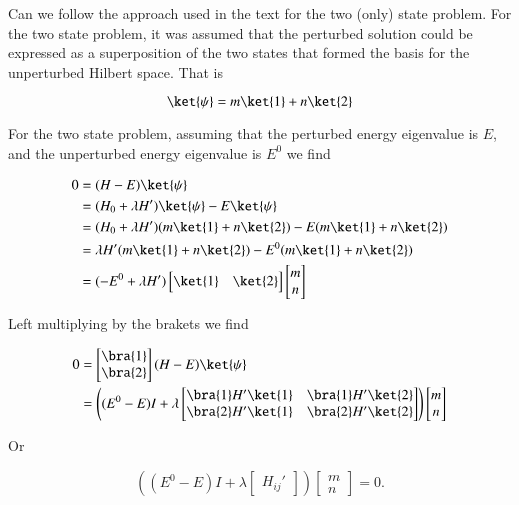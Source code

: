 Can we follow the approach used in the text for the two (only) state problem.  For the two state problem, it was assumed that the perturbed solution could be expressed as a superposition of the two states that formed the basis for the unperturbed Hilbert space.  That is

\begin{equation}\label{eqn:pertubationDegeneracy:30}
\ket{\psi} = m \ket{1} + n \ket{2}
\end{equation}

For the two state problem, assuming that the perturbed energy eigenvalue is $E$, and the unperturbed energy eigenvalue is $E^0$ we find

\begin{align*}
0 
&= (H - E) \ket{\psi} \\
&= (H_0 + \lambda H') \ket{\psi} - E \ket{\psi} \\
&= 
(H_0 + \lambda H') 
(m \ket{1} + n \ket{2})
-E 
(m \ket{1} + n \ket{2})
\\
&=
\lambda H' (m \ket{1} + n \ket{2}) 
-E^0 
(m \ket{1} + n \ket{2}) \\
&=
(-E^0 + \lambda H')
\begin{bmatrix}
\ket{1} & \ket{2} 
\end{bmatrix}
\begin{bmatrix}
m \\
n
\end{bmatrix}
\end{align*}

Left multiplying by the brakets we find

\begin{align*}
0 &= 
\begin{bmatrix}
\bra{1} \\
\bra{2} 
\end{bmatrix}
(H - E)\ket{\psi} \\
&=
\left(
(E^0 - E)I + \lambda
\begin{bmatrix}
\bra{1} H' \ket{1} & \bra{1} H' \ket{2} \\
\bra{2} H' \ket{1} & \bra{2} H' \ket{2} 
\end{bmatrix}
\right)
\begin{bmatrix}
m \\
n
\end{bmatrix}
\end{align*}

Or

\begin{equation}\label{eqn:pertubationDegeneracy:50}
\left( (E^0 - E)I + \lambda \begin{bmatrix} H_{ij}' \end{bmatrix} \right)
\begin{bmatrix}
m \\
n
\end{bmatrix}
= 0.
\end{equation}

